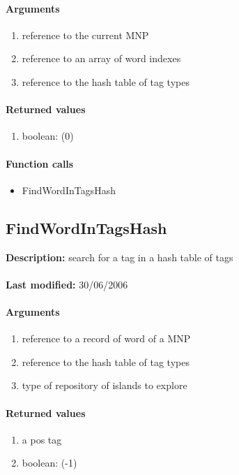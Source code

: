 \paragraph{Arguments}
\begin{enumerate}
\item reference to the current MNP
\item reference to an array of word indexes
\item reference to the hash table of tag types
\end{enumerate}

\paragraph{Returned values}
\begin{enumerate}
\item boolean: (0)
\end{enumerate}

\paragraph{Function calls}
\begin{itemize}
\item FindWordInTagsHash
\end{itemize}

\subsection{FindWordInTagsHash}
\textbf{Description:} search for a tag in a hash table of tags\\
\\\textbf{Last modified:} 30/06/2006

\paragraph{Arguments}
\begin{enumerate}
\item reference to a record of word of a MNP
\item reference to the hash table of tag types
\item type of repository of islands to explore
\end{enumerate}

\paragraph{Returned values}
\begin{enumerate}
\item a pos tag
\item boolean: (-1)
\end{enumerate}

